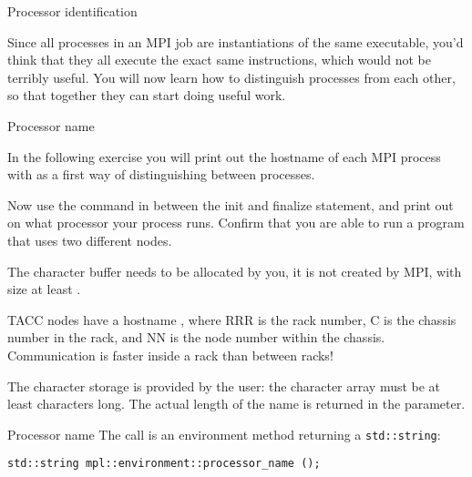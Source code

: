 
 {Processor identification}
\label{sec:rank-size}

Since all processes in an MPI job are instantiations of the same executable,
you'd think that they all execute the exact same instructions,
which would not be terribly useful.
You will now learn how to distinguish
processes from each other, so that together they can start doing
useful work.

 {Processor name}

In the following exercise you will print out the hostname 
of each MPI process
%
with
%
as a first way of distinguishing between processes.

\begin{exercise}
  \label{ex:procname}
  Now use the command 
  in between the
  init and finalize statement, and print out on what processor your process runs.
  Confirm that you are able to run a program that uses two different nodes.

  The character buffer needs to be allocated by you, it is not
  created by MPI, with size at
  least .

\begin{tacc}
    TACC nodes have a hostname , where RRR is the rack number, C is the chassis
    number in the rack, and NN is the node number within the chassis. Communication
    is faster inside a rack than between racks!
\end{tacc}
\end{exercise}

The character storage is provided by the user:
the character array must be at least  characters long.
The actual length of the name is returned in the  parameter.

\begin{mplnote}{Processor name}
  The  call is an environment method
  returning a \lstinline{std::string}:
\begin{lstlisting}
std::string mpl::environment::processor_name ();
\end{lstlisting}
\end{mplnote}

